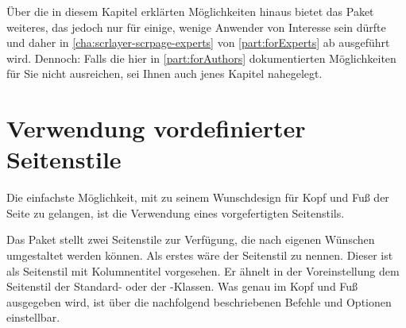 Über die in diesem Kapitel erklärten Möglichkeiten hinaus bietet das Paket
 weiteres, das jedoch nur für einige, wenige
Anwender von Interesse sein dürfte und daher in
\autoref{cha:scrlayer-scrpage-experts} von \autoref{part:forExperts} ab
 ausgeführt wird. Dennoch: Falls die
hier in \autoref{part:forAuthors} dokumentierten Möglichkeiten für Sie nicht
ausreichen, sei Ihnen auch jenes Kapitel nahegelegt.




\section{Verwendung vordefinierter Seitenstile}

Die einfachste Möglichkeit, mit  zu seinem
Wunschdesign für Kopf und Fuß der Seite zu gelangen, ist die Verwendung eines
vorgefertigten Seitenstils.
%
\iffalse %
  In diesem Abschnitt werden die vom Paket \Package{scrlayer-scrpage} bereits
  beim Laden definierten Seitenstile vorgestellt. Darüber hinaus werden
  diejenigen Befehle erklärt, mit denen grundlegende Einstellungen bei diesen
  Seitenstilen vorgenommen werden können. Weitere Optionen, Befehle und
  Hintergründe sind in den nachfolgenden Abschnitten, aber auch in
  \autoref{sec:scrlayer-scrpage-experts.pagestyle.pairs} in
  \autoref{part:forExperts} zu finden.%
\fi

\begin{Declaration}
\end{Declaration}
Das Paket  stellt zwei Seitenstile zur Verfügung,
die nach eigenen Wünschen umgestaltet werden können. Als erstes wäre der
Seitenstil  zu
nennen. Dieser ist als Seitenstil mit Kolumnentitel vorgesehen. Er ähnelt in
der Voreinstellung dem Seitenstil
 der Standard- oder der
\KOMAScript-Klassen. Was genau im Kopf und Fuß ausgegeben wird, ist über die
nachfolgend beschriebenen Befehle und Optionen einstellbar.

